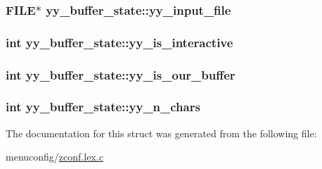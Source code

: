 \hypertarget{structyy__buffer__state_a4843d1422e3276b636d475a3095bd948}{
\subsubsection[{yy\-\_\-input\-\_\-file}]{\setlength{\rightskip}{0pt plus 5cm}F\-I\-L\-E$\ast$ yy\-\_\-buffer\-\_\-state\-::yy\-\_\-input\-\_\-file}}\label{structyy__buffer__state_a4843d1422e3276b636d475a3095bd948}
\hypertarget{structyy__buffer__state_abf5c70eea75581b58c0ee7bd31b14490}{
\subsubsection[{yy\-\_\-is\-\_\-interactive}]{\setlength{\rightskip}{0pt plus 5cm}int yy\-\_\-buffer\-\_\-state\-::yy\-\_\-is\-\_\-interactive}}\label{structyy__buffer__state_abf5c70eea75581b58c0ee7bd31b14490}
\hypertarget{structyy__buffer__state_a80ce2431c70dc4f89ced487f18449465}{
\subsubsection[{yy\-\_\-is\-\_\-our\-\_\-buffer}]{\setlength{\rightskip}{0pt plus 5cm}int yy\-\_\-buffer\-\_\-state\-::yy\-\_\-is\-\_\-our\-\_\-buffer}}\label{structyy__buffer__state_a80ce2431c70dc4f89ced487f18449465}
\hypertarget{structyy__buffer__state_a06406208824817acfec2183b79080945}{
\subsubsection[{yy\-\_\-n\-\_\-chars}]{\setlength{\rightskip}{0pt plus 5cm}int yy\-\_\-buffer\-\_\-state\-::yy\-\_\-n\-\_\-chars}}\label{structyy__buffer__state_a06406208824817acfec2183b79080945}


The documentation for this struct was generated from the following file\-:\begin{DoxyCompactItemize}
\item 
menuconfig/\hyperlink{zconf_8lex_8c}{zconf.\-lex.\-c}\end{DoxyCompactItemize}

